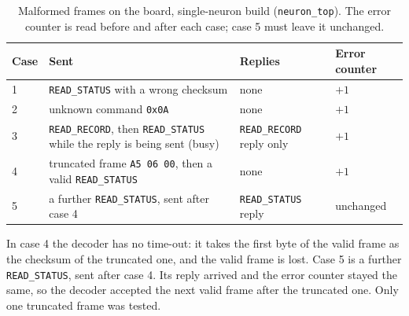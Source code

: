 \documentclass[11pt]{article}
\begin{document}
\begin{table}[t]
\centering
\caption{Malformed frames on the board, single-neuron build (\texttt{neuron\_top}). The error counter is read before and after each case; case 5 must leave it unchanged.}
\label{tab:robust}
{\small\begin{tabular}{p{0.8cm}p{6.4cm}p{4.4cm}p{2.2cm}}
\toprule
Case & Sent & Replies & Error counter \\
\midrule
1 & \texttt{READ\_STATUS} with a wrong checksum & none & $+1$ \\
2 & unknown command \texttt{0x0A} & none & $+1$ \\
3 & \texttt{READ\_RECORD}, then \texttt{READ\_STATUS} while the reply is being sent (busy) & \texttt{READ\_RECORD} reply only & $+1$ \\
4 & truncated frame \texttt{A5 06 00}, then a valid \texttt{READ\_STATUS} & none & $+1$ \\
5 & a further \texttt{READ\_STATUS}, sent after case 4 & \texttt{READ\_STATUS} reply & unchanged \\
\bottomrule
\end{tabular}}
\end{table}

In case 4 the decoder has no time-out: it takes the first byte of the valid frame as the checksum of the truncated one, and the valid frame is lost. Case 5 is a further \texttt{READ\_STATUS}, sent after case 4. Its reply arrived and the error counter stayed the same, so the decoder accepted the next valid frame after the truncated one. Only one truncated frame was tested.
\end{document}
